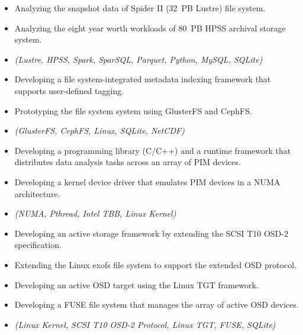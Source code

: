 \begin{itemize}
    \item {Analyzing the snapshot data of Spider II (32~PB Lustre) file system.}
    \item {Analyzing the eight year worth workloads of 80~PB HPSS archival storage system.}
    \item {\it\small (Lustre, HPSS, Spark, SparSQL, Parquet, Python, MySQL, SQLite)}
\end{itemize}

\begin{itemize}
    \item {Developing a file system-integrated metadata indexing framework that supports user-defined tagging.}
    \item {Prototyping the file system system using GlusterFS and CephFS.}
    \item {\it\small (GlusterFS, CephFS, Linux, SQLite, NetCDF)}
\end{itemize}

\begin{itemize}
    \item {Developing a programming library (C/C++) and a runtime framework
        that distributes data analysis tasks across an array of PIM devices.}
    \item {Developing a kernel device driver that emulates PIM devices in a NUMA architecture.}
    \item {\it\small(NUMA, Pthread, Intel TBB, Linux Kernel)}
\end{itemize}

\begin{itemize}
    \item {Developing an active storage framework by extending the SCSI T10 OSD-2
        specification.}
    \item {Extending the Linux exofs file system to support the extended OSD protocol.}
    \item {Developing an active OSD target using the Linux TGT framework.}
    \item {Developing a FUSE file system that manages the array of active OSD devices.}
    \item {\it\small(Linux Kernel, SCSI T10 OSD-2 Protocol, Linux TGT, FUSE, SQLite)}
\end{itemize}

